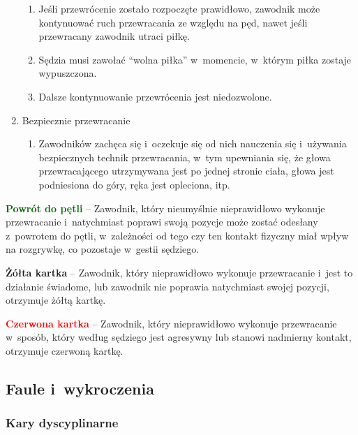 \documentclass[12pt]{article}
\newcommand\redcard[1]{\bgroup\textcolor{red}{\textbf{#1}}}
\newcommand\yellowcard[1]{\bgroup\textcolor{darkyellow}{\textbf{#1}}}
\newcommand\other[1]{\bgroup\textcolor{darkgreen}{\textbf{#1}}}
\begin{document}
\begin{enumerate}
	      \begin{enumerate}
		      \item
		            Jeśli przewrócenie zostało rozpoczęte prawidłowo, zawodnik może
		            kontynuować ruch przewracania ze względu na pęd, nawet jeśli
		            przewracany zawodnik utraci piłkę.
		      \item
		            Sędzia musi zawołać ``wolna piłka'' w~momencie, w~którym piłka
		            zostaje wypuszczona.
		      \item
		            Dalsze kontynuowanie przewrócenia jest niedozwolone.
	      \end{enumerate}
	\item
	      Bezpiecznie przewracanie

	      \begin{enumerate}
		      \item
		            Zawodników zachęca się i~oczekuje się od nich nauczenia się i~używania bezpiecznych technik przewracania, w~tym upewniania się, że
		            głowa przewracającego utrzymywana jest po jednej stronie ciała,
		            głowa jest podniesiona do góry, ręka jest opleciona, itp.
	      \end{enumerate}
\end{enumerate}

\other{Powrót do pętli} -- Zawodnik, który nieumyślnie nieprawidłowo
wykonuje przewracanie i~natychmiast poprawi swoją pozycje może zostać
odesłany z~powrotem do pętli, w~zależności od tego czy ten kontakt
fizyczny miał wpływ na rozgrywkę, co pozostaje w~gestii sędziego.

\yellowcard{Żółta kartka} -- Zawodnik, który nieprawidłowo wykonuje
przewracanie i~jest to działanie świadome, lub zawodnik nie poprawia
natychmiast swojej pozycji, otrzymuje żółtą kartkę.

\redcard{Czerwona kartka} -- Zawodnik, który nieprawidłowo wykonuje
przewracanie w~sposób, który według sędziego jest agresywny lub stanowi
nadmierny kontakt, otrzymuje czerwoną kartkę.

\subsection{Faule i~wykroczenia}

\subsubsection{Kary dyscyplinarne}
\end{document}
